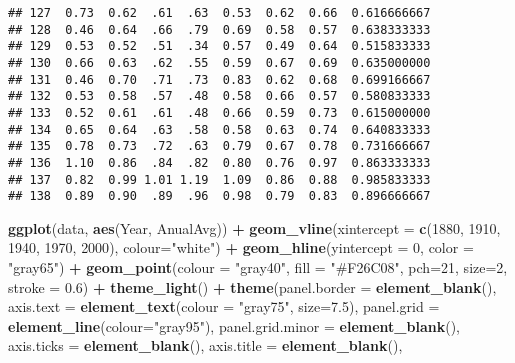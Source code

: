 \documentclass[]{article}
\newenvironment{Shaded}{\begin{snugshade}}{\end{snugshade}}
\newcommand{\DataTypeTok}[1]{\textcolor[rgb]{0.13,0.29,0.53}{#1}}
\newcommand{\DecValTok}[1]{\textcolor[rgb]{0.00,0.00,0.81}{#1}}
\newcommand{\FloatTok}[1]{\textcolor[rgb]{0.00,0.00,0.81}{#1}}
\newcommand{\KeywordTok}[1]{\textcolor[rgb]{0.13,0.29,0.53}{\textbf{#1}}}
\newcommand{\NormalTok}[1]{#1}
\newcommand{\OperatorTok}[1]{\textcolor[rgb]{0.81,0.36,0.00}{\textbf{#1}}}
\newcommand{\StringTok}[1]{\textcolor[rgb]{0.31,0.60,0.02}{#1}}
\begin{document}
\begin{verbatim}
## 127  0.73  0.62  .61  .63  0.53  0.62  0.66  0.616666667
## 128  0.46  0.64  .66  .79  0.69  0.58  0.57  0.638333333
## 129  0.53  0.52  .51  .34  0.57  0.49  0.64  0.515833333
## 130  0.66  0.63  .62  .55  0.59  0.67  0.69  0.635000000
## 131  0.46  0.70  .71  .73  0.83  0.62  0.68  0.699166667
## 132  0.53  0.58  .57  .48  0.58  0.66  0.57  0.580833333
## 133  0.52  0.61  .61  .48  0.66  0.59  0.73  0.615000000
## 134  0.65  0.64  .63  .58  0.58  0.63  0.74  0.640833333
## 135  0.78  0.73  .72  .63  0.79  0.67  0.78  0.731666667
## 136  1.10  0.86  .84  .82  0.80  0.76  0.97  0.863333333
## 137  0.82  0.99 1.01 1.19  1.09  0.86  0.88  0.985833333
## 138  0.89  0.90  .89  .96  0.98  0.79  0.83  0.896666667
\end{verbatim}

\begin{Shaded}
\begin{Highlighting}[]
\KeywordTok{ggplot}\NormalTok{(data, }\KeywordTok{aes}\NormalTok{(Year, AnualAvg)) }\OperatorTok{+}\StringTok{ }
\StringTok{  }\KeywordTok{geom_vline}\NormalTok{(}\DataTypeTok{xintercept =} \KeywordTok{c}\NormalTok{(}\DecValTok{1880}\NormalTok{, }\DecValTok{1910}\NormalTok{, }\DecValTok{1940}\NormalTok{, }\DecValTok{1970}\NormalTok{, }\DecValTok{2000}\NormalTok{), }\DataTypeTok{colour=}\StringTok{"white"}\NormalTok{) }\OperatorTok{+}
\StringTok{  }\KeywordTok{geom_hline}\NormalTok{(}\DataTypeTok{yintercept =} \DecValTok{0}\NormalTok{, }\DataTypeTok{color =} \StringTok{"gray65"}\NormalTok{) }\OperatorTok{+}
\StringTok{  }\KeywordTok{geom_point}\NormalTok{(}\DataTypeTok{colour =} \StringTok{"gray40"}\NormalTok{, }\DataTypeTok{fill =} \StringTok{"#F26C08"}\NormalTok{, }\DataTypeTok{pch=}\DecValTok{21}\NormalTok{, }\DataTypeTok{size=}\DecValTok{2}\NormalTok{, }\DataTypeTok{stroke =} \FloatTok{0.6}\NormalTok{) }\OperatorTok{+}\StringTok{ }
\StringTok{  }\KeywordTok{theme_light}\NormalTok{() }\OperatorTok{+}\StringTok{ }
\StringTok{  }\KeywordTok{theme}\NormalTok{(}\DataTypeTok{panel.border =} \KeywordTok{element_blank}\NormalTok{(),}
        \DataTypeTok{axis.text =} \KeywordTok{element_text}\NormalTok{(}\DataTypeTok{colour =} \StringTok{"gray75"}\NormalTok{, }\DataTypeTok{size=}\FloatTok{7.5}\NormalTok{),}
        \DataTypeTok{panel.grid =} \KeywordTok{element_line}\NormalTok{(}\DataTypeTok{colour=}\StringTok{"gray95"}\NormalTok{),}
        \DataTypeTok{panel.grid.minor =} \KeywordTok{element_blank}\NormalTok{(),}
        \DataTypeTok{axis.ticks =} \KeywordTok{element_blank}\NormalTok{(),}
        \DataTypeTok{axis.title =} \KeywordTok{element_blank}\NormalTok{(),}

\end{Highlighting}
\end{Shaded}
\end{document}
